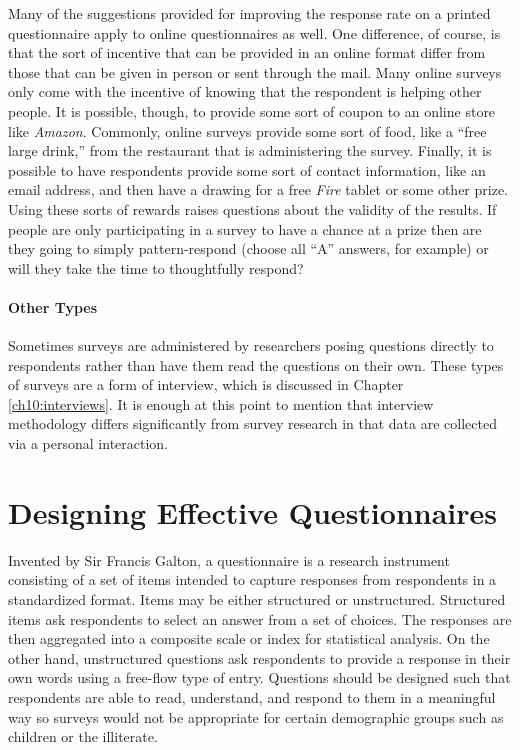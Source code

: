 Many of the suggestions provided for improving the response rate on a printed questionnaire apply to online questionnaires as well. One difference, of course, is that the sort of incentive that can be provided in an online format differ from those that can be given in person or sent through the mail. Many online surveys only come with the incentive of knowing that the respondent is helping other people. It is possible, though, to provide some sort of coupon to an online store like \textit{Amazon}. Commonly, online surveys provide some sort of food, like a ``free large drink,'' from the restaurant that is administering the survey. Finally, it is possible to have respondents provide some sort of contact information, like an email address, and then have a drawing for a free \textit{Fire} tablet or some other prize. Using these sorts of rewards raises questions about the validity of the results. If people are only participating in a survey to have a chance at a prize then are they going to simply pattern-respond (choose all ``A'' answers, for example) or will they take the time to thoughtfully respond?

\paragraph{Other Types}

Sometimes surveys are administered by researchers posing questions directly to respondents rather than have them read the questions on their own. These types of surveys are a form of interview, which is discussed in Chapter \ref{ch10:interviews}. It is enough at this point to mention that interview methodology differs significantly from survey research in that data are collected via a personal interaction. 

\section{Designing Effective Questionnaires}

Invented by Sir Francis Galton, a \gls{questionnaire} is a research instrument consisting of a set of items intended to capture responses from respondents in a standardized format. Items may be either structured or unstructured. Structured items ask respondents to select an answer from a set of choices. The responses are then aggregated into a composite scale or index for statistical analysis. On the other hand, unstructured questions ask respondents to provide a response in their own words using a free-flow type of entry. Questions should be designed such that respondents are able to read, understand, and respond to them in a meaningful way so surveys would not be appropriate for certain demographic groups such as children or the illiterate. 

